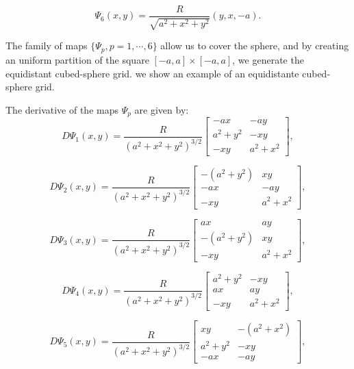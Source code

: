 \begin{equation}
	\label{chp3-eqdistant-psi6}
	\Psi_{6}(x,y) = \frac{R}{\sqrt{a^2 + x^2 + y^2}}(y, x, -a).
\end{equation}

The family of maps $\{\Psi_{p}, p = 1, \cdots, 6\}$ allow us to cover the sphere, and 
by creating an uniform partition of the square $[-a,a]\times[-a,a]$,
we generate the equidistant cubed-sphere grid. 
we show an example of an equidistante cubed-sphere grid.

The derivative of the maps $\Psi_p$ are given by:
\begin{equation}
	\label{chp3-eqdistant-dpsi1}
	D\Psi_{1}(x,y) = \frac{R}{{(a^2 + x^2 + y^2)}^{3/2}}
	\begin{bmatrix}
		-ax & -ay \\
	 	 a^2+y^2  & -xy \\
		 -xy  & a^2+x^2
	\end{bmatrix},
\end{equation}

\begin{equation}
	\label{chp3-eqdistant-dpsi2}
	D\Psi_{2}(x,y) = \frac{R}{{(a^2 + x^2 + y^2)}^{3/2}}
	\begin{bmatrix}
		-(a^2+y^2) & xy \\
		 -ax &  -ay \\
		 -xy &  a^2+x^2
	\end{bmatrix},
\end{equation}

\begin{equation}
	\label{chp3-eqdistant-dpsi3}
	D\Psi_{3}(x,y) = \frac{R}{{(a^2 + x^2 + y^2)}^{3/2}}
	\begin{bmatrix}
		 ax &  ay \\
		-(a^2+y^2) & xy \\
		 -xy &  a^2+x^2
	\end{bmatrix},
\end{equation}

\begin{equation}
	\label{chp3-eqdistant-dpsi4}
	D\Psi_{4}(x,y) = \frac{R}{{(a^2 + x^2 + y^2)}^{3/2}}	
	\begin{bmatrix}
		 a^2+y^2 &  -xy \\
		 ax & ay \\
		 -xy &  a^2+x^2
	\end{bmatrix},
\end{equation}

\begin{equation}
	\label{chp3-eqdistant-dpsi5}
	D\Psi_{5}(x,y) = \frac{R}{{(a^2 + x^2 + y^2)}^{3/2}}	
	\begin{bmatrix}
		 xy  & -(a^2+x^2) \\
	 	 a^2+y^2  &  -xy \\
		-ax & -ay
	\end{bmatrix},
\end{equation}

